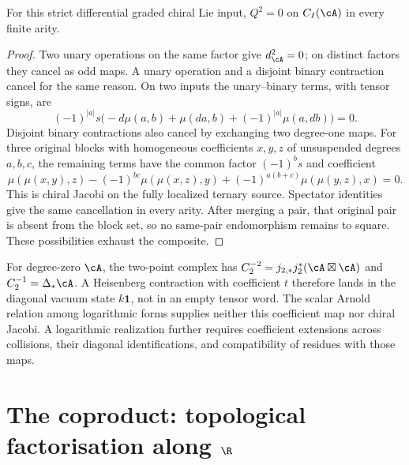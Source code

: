 \begin{proposition}
\label{prop:intro-chiral-lie-square-zero}
For this strict differential graded chiral Lie input, $Q^2=0$
on $C_I(\cA)$ in every finite arity.
\end{proposition}
\begin{proof}
Two unary operations on the same factor give $d_{\cA}^2=0$;
on distinct factors they cancel as odd maps. A unary operation
and a disjoint binary contraction cancel for the same reason.
On two inputs the
unary--binary terms, with tensor signs, are
\[
 (-1)^{|a|}s\bigl(-d\mu(a,b)+\mu(da,b)
                         +(-1)^{|a|}\mu(a,db)\bigr)=0.
\]
Disjoint binary contractions also cancel by exchanging two
degree-one maps. For three original blocks with homogeneous
coefficients $x,y,z$ of unsuspended degrees $a,b,c$, the remaining
terms have the common factor
$(-1)^b s$ and coefficient
\[
 \mu(\mu(x,y),z)-(-1)^{bc}\mu(\mu(x,z),y)
                  +(-1)^{a(b+c)}\mu(\mu(y,z),x)=0.
\]
This is chiral Jacobi on the fully localized ternary source.
Spectator identities give the same cancellation in every arity.
After merging a pair, that original pair is absent from the block
set, so no same-pair endomorphism remains to square.
These possibilities exhaust the composite.
\end{proof}

For degree-zero $\cA$, the two-point complex has
$C_2^{-2}=j_{2,*}j_2^*(\cA\boxtimes\cA)$ and
$C_2^{-1}=\Delta_*\cA$. A Heisenberg contraction with coefficient
$t$ therefore lands in the diagonal vacuum state $k\mathbf1$,
not in an empty tensor word. The scalar Arnold relation among
logarithmic forms supplies neither this coefficient map nor
chiral Jacobi. A logarithmic realization further requires
coefficient extensions across collisions, their diagonal
identifications, and compatibility of residues with those maps.

\section*{The coproduct: topological factorisation along $\R$}

